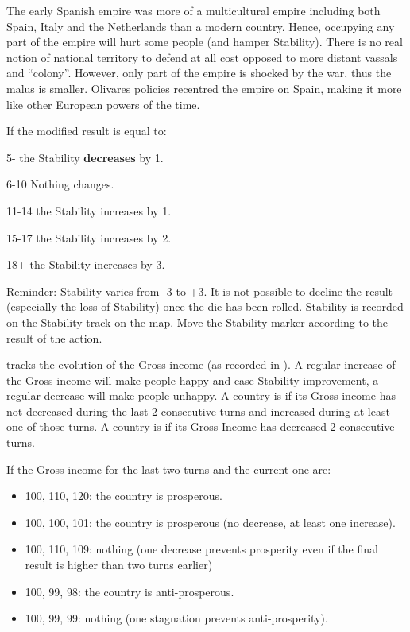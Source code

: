 \begin{designnote}
  The early Spanish empire was more of a multicultural empire including both
  Spain, Italy and the Netherlands than a modern country. Hence, occupying
  any part of the empire will hurt some people (and hamper Stability). There
  is no real notion of national territory to defend at all cost opposed to
  more distant vassals and ``colony''. However, only part of the empire is
  shocked by the war, thus the malus is smaller. Olivares policies recentred
  the empire on Spain, making it more like other European powers of the time.
\end{designnote}

\aparag[Result] If the modified result is equal to:
\begin{modlist}
  \item[5-] the Stability \textbf{decreases} by 1.
  \item[6-10] Nothing changes.
  \item[11-14] the Stability increases by 1.
  \item[15-17] the Stability increases by 2.
  \item[18+] the Stability increases by 3.
\end{modlist}
\bparag Reminder: Stability varies from -3 to +3. It is not possible to
decline the result (especially the loss of Stability) once the die has been
rolled.
\bparag Stability is recorded on the Stability track on the \ROTW map. Move
the Stability marker according to the result of the action.

\aparag[Prosperity]\label{chBudget:Prosperity} tracks the evolution of the
Gross income (as recorded in ). A regular increase
of the Gross income will make people happy and ease Stability improvement, a
regular decrease will make people unhappy.
 A country is  if its Gross income
has not decreased during the last 2 consecutive turns and increased during at
least one of those turns.
 A country is  if its
Gross Income has decreased 2 consecutive turns.

\begin{exemple}[Prosperity]
  If the Gross income for the last two turns and the current one are:
  \begin{itemize}
  \item 100, 110, 120: the country is prosperous.
  \item 100, 100, 101: the country is prosperous (no decrease, at least one
    increase).
  \item 100, 110, 109: nothing (one decrease prevents prosperity even if the
    final result is higher than two turns earlier)
  \item 100, 99, 98: the country is anti-prosperous.
  \item 100, 99, 99: nothing (one stagnation prevents anti-prosperity).
  \end{itemize}

\end{exemple}

